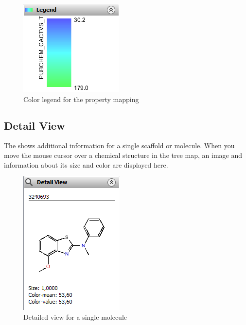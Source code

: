 %
\begin{figure}[!htb]
\begin{centering}
\includegraphics[scale=.6]{images/treemap/treemap_sidebar_legend}
\par\end{centering}

\caption{Color legend for the property mapping}
\label{fig:treemap:sidebar:legend}

%
\end{figure}

\subsection{Detail View}

The  shows additional information for a single scaffold or molecule. When you move the mouse cursor over a chemical structure in the tree map, an image and information about its size and color are displayed here.

%
\begin{figure}[!htb]
\begin{centering}
\includegraphics[scale=.6]{images/treemap/treemap_sidebar_detail}
\par\end{centering}

\caption{Detailed view for a single molecule}
\label{fig:treemap:sidebar:detail}

%
\end{figure}
